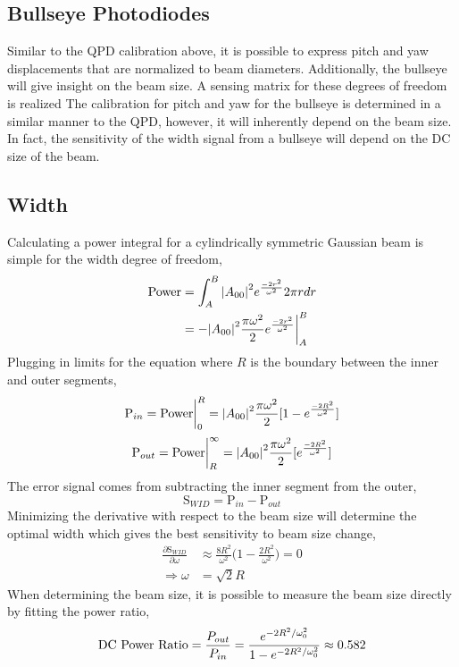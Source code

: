 \begin{appendices}
	\section{Bullseye Photodiodes}
	
	Similar to the QPD calibration above, it is possible to express pitch and yaw displacements that are normalized to beam diameters.  Additionally, the bullseye will give insight on the beam size.  A sensing matrix for these degrees of freedom is realized 
	The calibration for pitch and yaw for the bullseye is determined in a similar manner to the QPD, however, it will inherently depend on the beam size.  In fact, the sensitivity of the width signal from a bullseye will depend on the DC size of the beam.  
	
	\subsection{Width}
	Calculating a power integral for a cylindrically symmetric Gaussian beam is simple for the width degree of freedom,
	\begin{equation}
	\begin{split}
	\text{Power} &= \int_{A}^{B} \abs{A_{00}}^2e^{\frac{-2r^2}{\omega^2}} 2\pi r dr\\
			&= -\abs{A_{00}}^2 \frac{\pi \omega^2}{2} e^{\frac{-2r^2}{\omega^2}} \biggr\rvert_A^B
	\end{split}
	\end{equation}
	Plugging in limits for the equation where $R$ is the boundary between the inner and outer segments,
	\begin{equation}
	\text{P}_{in} = \text{Power} \biggr\rvert_0^{R} = \abs{A_{00}}^2 \frac{\pi \omega^2}{2} [1 - e^{\frac{-2R^2}{\omega^2}}]
	\end{equation}
	\begin{equation}
	\text{P}_{out} = \text{Power} \biggr\rvert_{R}^{\infty} = \abs{A_{00}}^2 \frac{\pi \omega^2}{2} [e^{\frac{-2R^2}{\omega^2}}]
	\end{equation}
	The error signal comes from subtracting the inner segment from the outer,
	\begin{equation}
	\text{S}_{WID} =  \text{P}_{in} - \text{P}_{out}
	\end{equation}
	Minimizing the derivative with respect to the beam size will determine the optimal width which gives the best sensitivity to beam size change,
	\begin{equation}
	\begin{aligned}
	\frac{\partial \text{S}_{WID}}{\partial \omega} &\approx \frac{8 R^2}{\omega^2} \bigg(1-\frac{2 R^2}{\omega^2}\bigg) = 0 \\
	\Rightarrow	\omega &= \sqrt{2} R
	\end{aligned}
	\end{equation}
	When determining the beam size, it is possible to measure the beam size directly by fitting the power ratio,
	\begin{equation}
	\text{DC Power Ratio} 
	= \frac{P_{out}}{P_{in}} \\
	= \frac{e^{-2R^2/ \omega_{0}^2}} {1 - e^{-2R^2/ \omega_{0}^2 }} \approx 0.582
	\end{equation}


\end{appendices}
